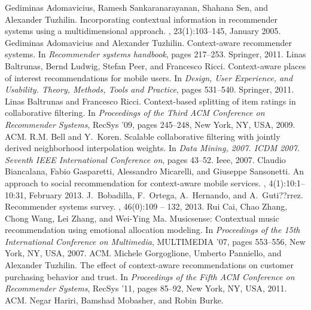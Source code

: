 \documentclass{llncs}
\begin{document}
\begin{thebibliography}{10}
Gediminas Adomavicius, Ramesh Sankaranarayanan, Shahana Sen, and Alexander
Tuzhilin.
\newblock Incorporating contextual information in recommender systems using a
multidimensional approach.
, 23(1):103--145, January 2005.
Gediminas Adomavicius and Alexander Tuzhilin.
\newblock Context-aware recommender systems.
\newblock In {\em Recommender systems handbook}, pages 217--253. Springer,
2011.
Linas Baltrunas, Bernd Ludwig, Stefan Peer, and Francesco Ricci.
\newblock Context-aware places of interest recommendations for mobile users.
\newblock In {\em Design, User Experience, and Usability. Theory, Methods,
Tools and Practice}, pages 531--540. Springer, 2011.
Linas Baltrunas and Francesco Ricci.
\newblock Context-based splitting of item ratings in collaborative filtering.
\newblock In {\em Proceedings of the Third ACM Conference on Recommender
Systems}, RecSys '09, pages 245--248, New York, NY, USA, 2009. ACM.
R.M. Bell and Y.~Koren.
\newblock Scalable collaborative filtering with jointly derived neighborhood
interpolation weights.
\newblock In {\em Data Mining, 2007. ICDM 2007. Seventh IEEE International
Conference on}, pages 43--52. Ieee, 2007.
Claudio Biancalana, Fabio Gasparetti, Alessandro Micarelli, and Giuseppe
Sansonetti.
\newblock An approach to social recommendation for context-aware mobile
services.
, 4(1):10:1--10:31, February
2013.
J.~Bobadilla, F.~Ortega, A.~Hernando, and A.~Guti??rrez.
\newblock Recommender systems survey.
, 46(0):109 -- 132, 2013.
Rui Cai, Chao Zhang, Chong Wang, Lei Zhang, and Wei-Ying Ma.
\newblock Musicsense: Contextual music recommendation using emotional
allocation modeling.
\newblock In {\em Proceedings of the 15th International Conference on
Multimedia}, MULTIMEDIA '07, pages 553--556, New York, NY, USA, 2007. ACM.
Michele Gorgoglione, Umberto Panniello, and Alexander Tuzhilin.
\newblock The effect of context-aware recommendations on customer purchasing
behavior and trust.
\newblock In {\em Proceedings of the Fifth ACM Conference on Recommender
Systems}, RecSys '11, pages 85--92, New York, NY, USA, 2011. ACM.
Negar Hariri, Bamshad Mobasher, and Robin Burke.

\end{thebibliography}
\end{document}
